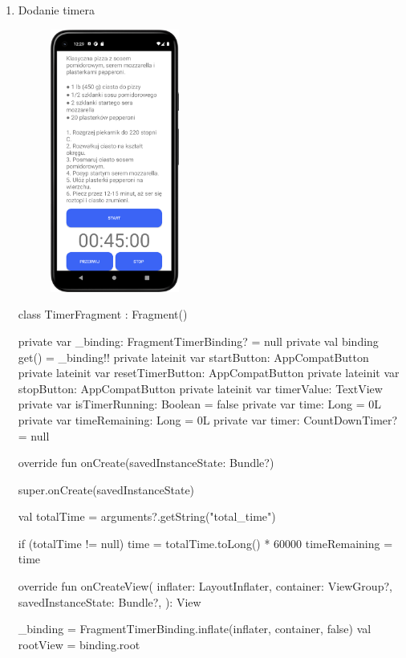 \documentclass{article}
\begin{document}
\begin{enumerate}
\newpage
\item Dodanie timera
\begin{figure}[ht]
    \centering
    \includegraphics[width=0.4\textwidth]{../res/phone_timer}
\end{figure}

\newpage

\begin{mylisting}
class TimerFragment : Fragment() {
    private var _binding: FragmentTimerBinding? = null
    private val binding get() = _binding!!
    private lateinit var startButton: AppCompatButton
    private lateinit var resetTimerButton: AppCompatButton
    private lateinit var stopButton: AppCompatButton
    private lateinit var timerValue: TextView
    private var isTimerRunning: Boolean = false
    private var time: Long = 0L
    private var timeRemaining: Long = 0L
    private var timer: CountDownTimer? = null

    override fun onCreate(savedInstanceState: Bundle?) {
        super.onCreate(savedInstanceState)

        val totalTime = arguments?.getString("total_time")

        if (totalTime != null) {
            time = totalTime.toLong() * 60000
        }
        timeRemaining = time
    }

    override fun onCreateView(
        inflater: LayoutInflater, container: ViewGroup?,
        savedInstanceState: Bundle?,
    ): View {
        _binding = FragmentTimerBinding.inflate(inflater, container, false)
        val rootView = binding.root

}}
\end{mylisting}
\end{enumerate}
\end{document}
